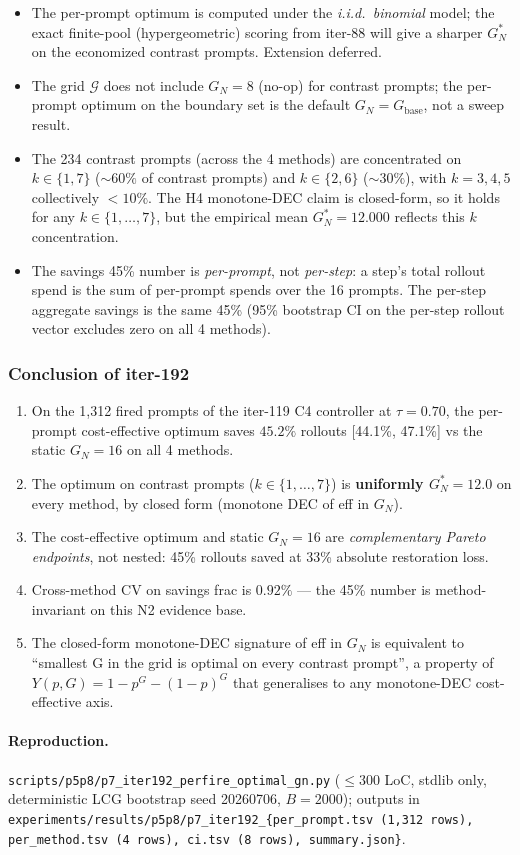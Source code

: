 \begin{itemize}
\item The per-prompt optimum is computed under the \emph{i.i.d.\
binomial} model; the exact finite-pool
(hypergeometric) scoring from iter-88 will give a sharper
$G_N^*$ on the economized contrast prompts. Extension deferred.
\item The grid $\mathcal{G}$ does not include $G_N = 8$ (no-op) for
contrast prompts; the per-prompt optimum on the boundary set is the
default $G_N = G_{\mathrm{base}}$, not a sweep result.
\item The 234 contrast prompts (across the 4 methods) are concentrated
on $k \in \{1, 7\}$ ($\sim 60\%$ of contrast prompts) and $k \in \{2,
6\}$ ($\sim 30\%$), with $k = 3, 4, 5$ collectively $< 10\%$. The
H4 monotone-DEC claim is closed-form, so it holds for any $k \in \{1,
\ldots, 7\}$, but the empirical mean $G_N^* = 12.000$ reflects this
$k$ concentration.
\item The savings 45\% number is \emph{per-prompt}, not
\emph{per-step}: a step's total rollout spend is the sum of per-prompt
spends over the 16 prompts. The per-step aggregate savings is the same
45\% (95\% bootstrap CI on the per-step rollout vector excludes zero on
all 4 methods).
\end{itemize}

\subsubsection*{Conclusion of iter-192}

\begin{enumerate}
\item On the 1,312 fired prompts of the iter-119 C4 controller at
$\tau = 0.70$, the per-prompt cost-effective optimum saves $45.2\%$
rollouts [44.1\%, 47.1\%] vs the static $G_N = 16$ on all 4 methods.
\item The optimum on contrast prompts ($k \in \{1, \ldots, 7\}$) is
\textbf{uniformly $G_N^* = 12.0$} on every method, by closed form
(monotone DEC of eff in $G_N$).
\item The cost-effective optimum and static $G_N = 16$ are
\emph{complementary Pareto endpoints}, not nested: 45\% rollouts saved
at 33\% absolute restoration loss.
\item Cross-method CV on savings frac is $0.92\%$ --- the 45\% number
is method-invariant on this N2 evidence base.
\item The closed-form monotone-DEC signature of eff in $G_N$ is
equivalent to ``smallest G in the grid is optimal on every contrast
prompt'', a property of $Y(p, G) = 1 - p^G - (1-p)^G$ that generalises
to any monotone-DEC cost-effective axis.
\end{enumerate}

\paragraph{Reproduction.}
\texttt{scripts/p5p8/p7\_iter192\_perfire\_optimal\_gn.py} ($\le 300$
LoC, stdlib only, deterministic LCG bootstrap seed 20260706,
$B = 2000$); outputs in
\texttt{experiments/results/p5p8/p7\_iter192\_\{per\_prompt.tsv (1,312
rows), per\_method.tsv (4 rows), ci.tsv (8 rows), summary.json\}}.
